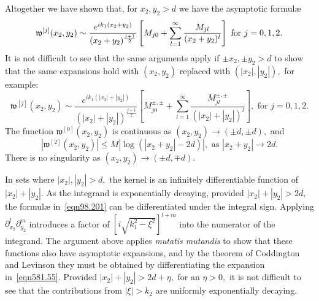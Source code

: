 \documentclass[11pt]{article}
\newcommand{\Bk}{\color{black}}
\newcommand{\Rd}{\color{black}}
\newcommand\fw{\mathfrak w}
\newcommand\pa{\partial}
\theoremstyle{definition}
\theoremstyle{remark}
\begin{document}
    Altogether we have shown that, for $x_2,y_2>d$ we have the asymptotic
    formul{\ae}
    \begin{equation}\label{eqn581.55}
 \fw^{[j]}(x_2,y_2)\sim \\
      \frac{e^{ik_1(x_2+y_2)}}{(x_2+y_2)^{\frac{j+1}{2}}}\left[M_{j0}+\sum_{l=1}^{\infty}\frac{M_{jl}}{(x_2+y_2)^l}\right]
       \text{  for }j=0,1,2. 
    \end{equation}
     It is not difficult to see that the same arguments apply if
    $\pm x_2,\pm y_2>d$
    to show that the same expansions hold with $(x_2,y_2)$ replaced with
    $(|x_2|,|y_2|),$ for example:
    \begin{equation}\label{eqn80.56}
      \fw^{[j]}(x_2,y_2)\sim
      \frac{e^{ik_1(|x_2|+|y_2|)}}{(|x_2|+|y_2|)^{\frac{j+1}{2}}}\left[M^{\pm,\pm}_{j0}+\sum_{l=1}^{\infty}
        \frac{M^{\pm,\pm}_{jl}}{(|x_2|+|y_2|)^l}\right],
       \text{  for }j=0,1,2. 
    \end{equation}
    The function $\fw^{[0]}(x_2,y_2)$ is continuous as
$(x_2,y_2)\to (\pm d,\pm d),$ and
   \begin{equation}\label{eqn230.667}
     |\fw^{[2]}(x_2,y_2)|\leq M|\log(|x_2+y_2|-2d)|,\text{ as }|x_2+y_2|\to 2d.
   \end{equation}
   There is no singularity as $(x_2,y_2)\to (\pm d ,\mp d).$ 
    
    \Rd In sets where $|x_2|, |y_2|>d,$ the kernel is an infinitely
    differentiable function of $|x_2|+|y_2|.$ As the integrand is exponentially
    decaying, provided $|x_2|+|y_2|>2d,$ the formul{\ae} in~\eqref{eqn98.201}
    can be differentiated under the integral sign. Applying
    $\pa_{x_2}^l\pa_{y_2}^m$ introduces a factor of
    $[i\sqrt{k_1^2-\xi^2}]^{l+m}$ into the numerator of the integrand. The
    argument above applies {\em mutatis mutandis} to show that these functions
    also have asymptotic expansions, and by the theorem of Coddington and
    Levinson they must be obtained by differentiating the expansion
    in~\eqref{eqn581.55}. Provided $|x_2|+|y_2|>2d+\eta,$ for an
    $\eta>0,$ it is not difficult to see that the contributions from $|\xi|>k_2$
    are uniformly exponentially decaying. \Bk 
    
\end{document}
